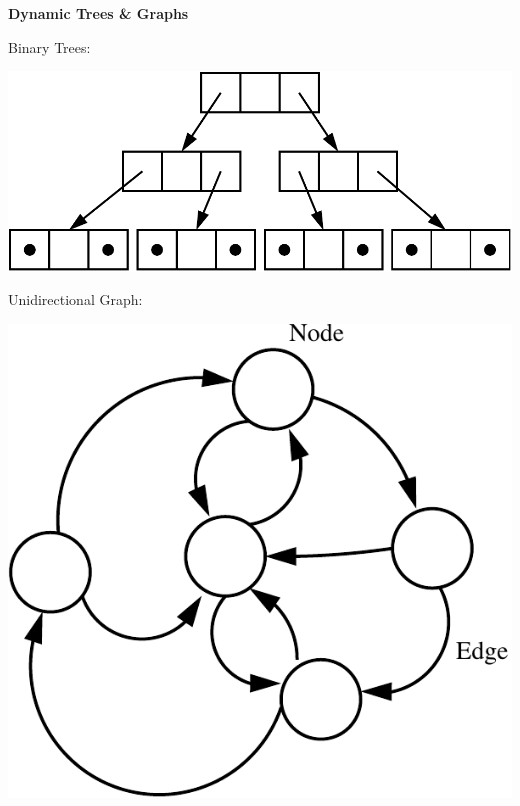 \documentclass[a4,portraitt]{slides}
\begin{document}
\newpage
{\samepage
\begin{center}
{\Large{\bf Dynamic Trees \& Graphs}}
\end{center}
Binary Trees:
\begin{center}
\includegraphics{../Images/tree.pdf}
\end{center}
Unidirectional Graph:
\begin{center}
\includegraphics{../Images/graph.pdf}
\end{center}
}
\end{document}
